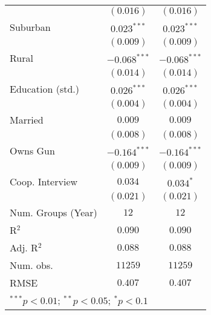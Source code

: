 \begin{table}
\begin{center}
\begin{tabular}{l c c}
                                 & $(0.016)$      & $(0.016)$      \\
Suburban                         & $0.023^{***}$  & $0.023^{***}$  \\
                                 & $(0.009)$      & $(0.009)$      \\
Rural                            & $-0.068^{***}$ & $-0.068^{***}$ \\
                                 & $(0.014)$      & $(0.014)$      \\
Education (std.)                 & $0.026^{***}$  & $0.026^{***}$  \\
                                 & $(0.004)$      & $(0.004)$      \\
Married                          & $0.009$        & $0.009$        \\
                                 & $(0.008)$      & $(0.008)$      \\
Owns Gun                         & $-0.164^{***}$ & $-0.164^{***}$ \\
                                 & $(0.009)$      & $(0.009)$      \\
Coop. Interview                  & $0.034$        & $0.034^{*}$    \\
                                 & $(0.021)$      & $(0.021)$      \\
\midrule
Num. Groups (Year)               & $12$           & $12$           \\
R$^2$                            & $0.090$        & $0.090$        \\
Adj. R$^2$                       & $0.088$        & $0.088$        \\
Num. obs.                        & $11259$        & $11259$        \\
RMSE                             & $0.407$        & $0.407$        \\
\bottomrule
\multicolumn{3}{l}{\scriptsize{$^{***}p<0.01$; $^{**}p<0.05$; $^{*}p<0.1$}}
\end{tabular}
\label{table_ate_prior_shootings}
\end{center}
\end{table}
